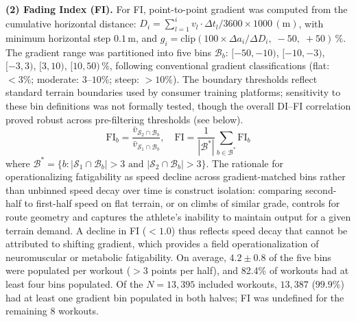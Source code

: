 \documentclass[times, twoside]{zHenriquesLab-StyleBioRxiv}
\begin{document}
\textbf{(2) Fading Index (FI).} For FI, point-to-point gradient was computed from the cumulative horizontal distance: $D_i = \sum_{l=1}^{i} v_l \cdot \Delta t_l / 3600 \times 1000\,\mathrm{(m)}$, with minimum horizontal step $0.1\,\mathrm{m}$, and $g_i = \text{clip}(100 \times \Delta a_i / \Delta D_i,\; -50,\; +50)\,\%$. The gradient range was partitioned into five bins $\mathcal{B}_b$: $[-50,-10)$, $[-10,-3)$, $[-3,3)$, $[3,10)$, $[10,50)\,\%$, following conventional gradient classifications (flat: $< 3\%$; moderate: $3$--$10\%$; steep: $> 10\%$). The boundary thresholds reflect standard terrain boundaries used by consumer training platforms; sensitivity to these bin definitions was not formally tested, though the overall DI--FI correlation proved robust across pre-filtering thresholds (see below).
\[
  \text{FI}_b = \frac{\bar{v}_{\mathcal{S}_2 \cap \mathcal{B}_b}}{\bar{v}_{\mathcal{S}_1 \cap \mathcal{B}_b}}, \quad \text{FI} = \frac{1}{|\mathcal{B}^*|} \sum_{b \in \mathcal{B}^*} \text{FI}_b
\]
where $\mathcal{B}^* = \{b : |\mathcal{S}_1 \cap \mathcal{B}_b| > 3 \text{ and } |\mathcal{S}_2 \cap \mathcal{B}_b| > 3\}$. The rationale for operationalizing fatigability as speed decline across gradient-matched bins rather than unbinned speed decay over time is construct isolation: comparing second-half to first-half speed on flat terrain, or on climbs of similar grade, controls for route geometry and captures the athlete's inability to maintain output for a given terrain demand. A decline in FI ($< 1.0$) thus reflects speed decay that cannot be attributed to shifting gradient, which provides a field operationalization of neuromuscular or metabolic fatigability. On average, $4.2 \pm 0.8$ of the five bins were populated per workout ($>3$ points per half), and 82.4\% of workouts had at least four bins populated. Of the $N = 13{,}395$ included workouts, $13{,}387$ ($99.9\%$) had at least one gradient bin populated in both halves; FI was undefined for the remaining 8 workouts.
\end{document}
